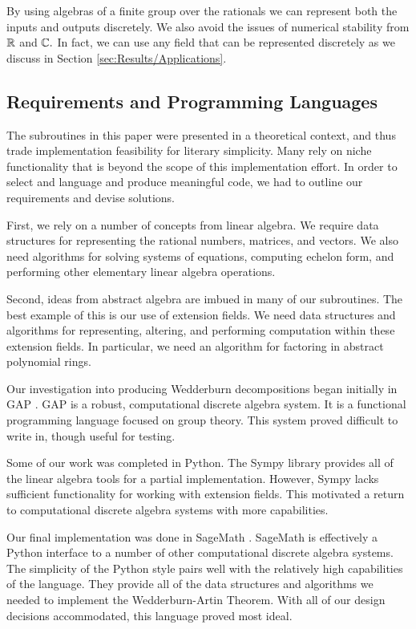 \documentclass[../thesis.tex]{subfiles}
\begin{document}
By using algebras of a finite group over the rationals we can represent both the inputs and outputs discretely. We also avoid the issues of numerical stability from $\mathbb{R}$ and $\mathbb{C}.$ In fact, we can use any field that can be represented discretely as we discuss in Section \ref{sec:Results/Applications}.

\subsection{Requirements and Programming Languages}
The subroutines in this paper were presented in a theoretical context, and thus trade implementation feasibility for literary simplicity. Many rely on niche functionality that is beyond the scope of this implementation effort. In order to select and language and produce meaningful code, we had to outline our requirements and devise solutions.

First, we rely on a number of concepts from linear algebra. We require data structures for representing the rational numbers, matrices, and vectors. We also need algorithms for solving systems of equations, computing echelon form, and performing other elementary linear algebra operations.

Second, ideas from abstract algebra are imbued in many of our subroutines. The best example of this is our use of extension fields. We need data structures and algorithms for representing, altering, and performing computation within these extension fields. In particular, we need an algorithm for factoring in abstract polynomial rings.

Our investigation into producing Wedderburn decompositions began initially in GAP \cite{gap}. GAP is a robust, computational discrete algebra system. It is a functional programming language focused on group theory. This system proved difficult to write in, though useful for testing.

Some of our work was completed in Python. The Sympy \cite{sympy} library provides all of the linear algebra tools for a partial implementation. However, Sympy lacks sufficient functionality for working with extension fields. This motivated a return to computational discrete algebra systems with more capabilities. 

Our final implementation was done in SageMath \cite{sage}. SageMath is effectively a Python interface to a number of other computational discrete algebra systems. The simplicity of the Python style pairs well with the relatively high capabilities of the language. They provide all of the data structures and algorithms we needed to implement the Wedderburn-Artin Theorem. With all of our design decisions accommodated, this language proved most ideal.
\end{document}
